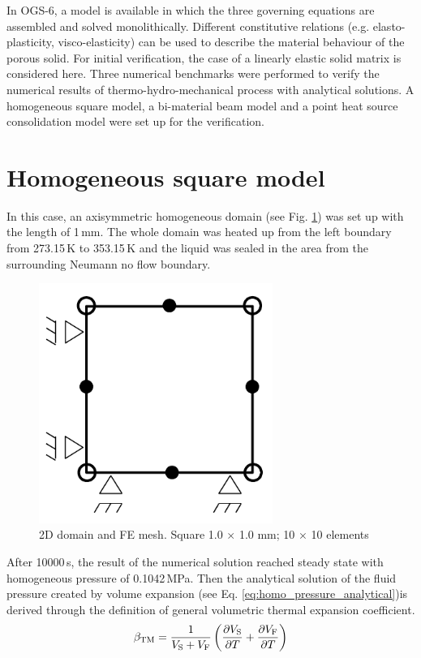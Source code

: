 \documentclass[a4paper,10pt]{article}
\begin{document}
In OGS-6, a model is available in which the three governing equations are assembled and solved monolithically. Different constitutive relations (e.g. elasto-plasticity, visco-elasticity) can be used to describe the material behaviour of the porous solid. For initial verification, the case of a linearly elastic solid matrix is considered here. Three numerical benchmarks were performed to verify the numerical results of thermo-hydro-mechanical process with analytical solutions. A homogeneous square model, a bi-material beam model and a point heat source consolidation model were set up for the verification. 

\section*{Homogeneous square model}
In this case, an axisymmetric homogeneous domain (see Fig. \ref{fig:beam_homogeneous_conceptual}) was set up with the length of 1\,mm. The whole domain was heated up from the left boundary from 273.15\,K to 353.15\,K and the liquid was sealed in the area from the surrounding Neumann no flow boundary. 
\begin{figure}
	\centering
		\includegraphics*[width=3in, keepaspectratio=false]{figures/scu.pdf}
	\caption{2D domain and FE mesh. Square 1.0 $\times$ 1.0 mm; 10 $\times$ 10 elements}
	\label{fig:beam_homogeneous_conceptual}
\end{figure} 
After 10000\,s, the result of the numerical solution reached steady state with homogeneous pressure of 0.1042\,MPa. 
Then the analytical solution of the fluid pressure created by volume expansion (see Eq. \ref{eq:homo_pressure_analytical})is derived through the definition of general volumetric thermal expansion coefficient.
\begin{equation}
\label{eq:beta_mix}
\beta_\mathrm{TM} = \frac{1}{V_\mathrm{S} + V_\mathrm{F}}\left( \frac{\partial V_\mathrm{S}}{\partial T} + \frac{\partial V_\mathrm{F}}{\partial T} \right)
\end{equation}
\end{document}
